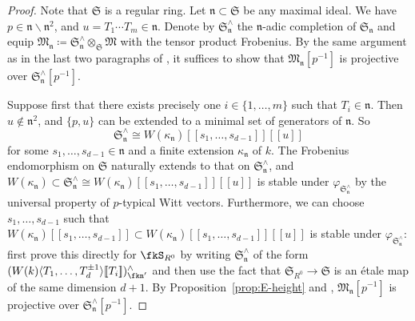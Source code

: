 \begin{proof}
Note that $\mathfrak{S}$ is a regular ring. Let $\mathfrak{n} \subset \mathfrak{S}$ be any maximal ideal. We have $p \in \mathfrak{n} \smallsetminus \mathfrak{n}^2$, and $u = T_1\cdots T_m \in \mathfrak{n}$. Denote by $\mathfrak{S}_{\mathfrak{n}}^{\wedge}$ the $\mathfrak{n}$-adic completion of $\mathfrak{S}_{\mathfrak{n}}$ and equip $\mathfrak{M}_{\mathfrak{n}} \coloneqq \mathfrak{S}_{\mathfrak{n}}^{\wedge}\otimes_{\mathfrak{S}} \mathfrak{M}$ with the tensor product Frobenius. By the same argument as in the last two paragraphs of \cite[Prop.~4.13, Pf.]{du-liu-moon-shimizu-completed-prismatic-F-crystal-loc-system}, it suffices to show that $\mathfrak{M}_{\mathfrak{n}}[p^{-1}]$ is projective over $\mathfrak{S}_{\mathfrak{n}}^{\wedge}[p^{-1}]$. 

Suppose first that there exists precisely one $i \in \{1, \ldots, m\}$ such that $T_i \in \mathfrak{n}$. Then $u \notin \mathfrak{n}^2$, and $\{p, u\}$ can be extended to a minimal set of generators of $\mathfrak{n}$. So
\[
\mathfrak{S}_{\mathfrak{n}}^{\wedge} \cong W(\kappa_{\mathfrak{n}})[\![s_1, \ldots, s_{d-1}]\!][\![u]\!]
\]
for some $s_1, \ldots, s_{d-1} \in \mathfrak{n}$ and a finite extension $\kappa_{\mathfrak{n}}$ of $k$. The Frobenius endomorphism on $\mathfrak{S}$ naturally extends to that on $\mathfrak{S}_{\mathfrak{n}}^{\wedge}$, and $W(\kappa_{\mathfrak{n}}) \subset \mathfrak{S}_{\mathfrak{n}}^{\wedge} \cong W(\kappa_{\mathfrak{n}})[\![s_1, \ldots, s_{d-1}]\!][\![u]\!]$ is stable under $\varphi_{\mathfrak{S}_{\mathfrak{n}}^{\wedge}}$ by the universal property of $p$-typical Witt vectors. Furthermore, we can choose $s_1, \ldots, s_{d-1}$ such that $W(\kappa_{\mathfrak{n}})[\![s_1, \ldots, s_{d-1}]\!] \subset W(\kappa_{\mathfrak{n}})[\![s_1, \ldots, s_{d-1}]\!][\![u]\!]$ is stable under $\varphi_{\mathfrak{S}_{\mathfrak{n}}^{\wedge}}$: first prove this directly for $\fkS_{R^0}$ by writing $\mathfrak{S}_{\mathfrak{n}}^{\wedge}$ of the form $(W(k)\langle T_1,\ldots,T_d^{\pm 1}\rangle[\![ T_i]\!])^\wedge_{\fkn'}$ and then use the fact that $\mathfrak{S}_{R^0} \rightarrow \mathfrak{S}$ is an \'etale map of the same dimension $d+1$. By Proposition~\ref{prop:E-height} and \cite[Lem.~4.11, 4.12]{du-liu-moon-shimizu-completed-prismatic-F-crystal-loc-system}, $\mathfrak{M}_{\mathfrak{n}}[p^{-1}]$ is projective over $\mathfrak{S}_{\mathfrak{n}}^{\wedge}[p^{-1}]$.


\end{proof}
